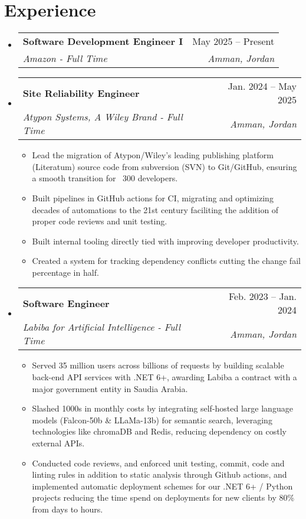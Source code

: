 \documentclass[letterpaper,11pt]{article}
\makeatletter
\newcommand{\resumeItem}[1]{
  \item\small{
    {#1 \vspace{0.5pt}}
  }
}
\newcommand{\resumeSubheading}[4]{
  \vspace{-2pt}\item
    \begin{tabular*}{0.97\textwidth}[t]{l@{\extracolsep{\fill}}r}
      \textbf{#1} & #2 \\
      \textit{\small#3} & \textit{\small #4} \\
    \end{tabular*}\vspace{-7pt}
}
\newcommand{\resumeSubHeadingListStart}{\begin{itemize}[leftmargin=0.0in, label={}]}
\newcommand{\resumeSubHeadingListEnd}{\end{itemize}}
\newcommand{\resumeItemListStart}{\vspace{2pt}\begin{itemize}}
\newcommand{\resumeItemListEnd}{\end{itemize}\vspace{-5pt}}
\makeatother
\begin{document}
\section{Experience}
  \resumeSubHeadingListStart
  \resumeSubheading
      {Software Development Engineer I}{May 2025 -- Present}
      {Amazon - Full Time}{Amman, Jordan}
      \resumeItemListStart
      \hfill 
      \resumeItemListEnd
  \resumeSubheading
      {Site Reliability Engineer}{Jan. 2024 -- May 2025}
      {Atypon Systems, A Wiley Brand - Full Time}{Amman, Jordan}
      \resumeItemListStart
      \resumeItem{
        Lead the migration of Atypon/Wiley's leading publishing platform (Literatum) source code from 
        subversion (SVN) to Git/GitHub, ensuring a smooth transition for ~300 developers.
      }
      \resumeItem{
        Built pipelines in GitHub actions for CI, migrating and optimizing decades of automations to the 21st century
        faciliting the addition of proper code reviews and unit testing.
      }
      \resumeItem{
        Built internal tooling directly tied with improving developer productivity.
      }
      \resumeItem{
          Created a system for tracking dependency conflicts cutting the change fail percentage in half.
      }
      \resumeItemListEnd
    \resumeSubheading
      {Software Engineer}{Feb. 2023 -- Jan. 2024}
      {Labiba for Artificial Intelligence - Full Time}{Amman, Jordan}
      \resumeItemListStart
      \resumeItem{
        Served 35 million users across billions of requests by building scalable back-end API services with .NET 6+, awarding Labiba a contract with a major government entity in Saudia Arabia.
      }
      \resumeItem{
         Slashed 1000s in monthly costs by integrating self-hosted large language models (Falcon-50b \& LLaMa-13b) for semantic search, leveraging technologies like chromaDB and Redis, reducing dependency on costly external APIs.
      }
    \resumeItem{
        Conducted code reviews, and enforced unit testing, commit, code and linting rules in addition to static analysis through Github actions, and implemented automatic deployment schemes for our .NET 6+ / Python projects reducing the time spend on deployments for new clients by 80\% from days to hours.
    }
      \resumeItemListEnd

  \resumeSubHeadingListEnd
    


\end{document}
